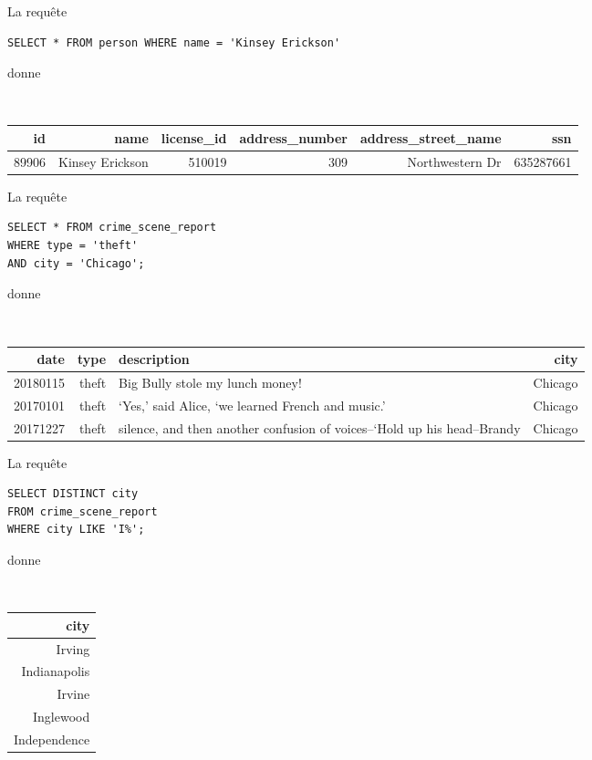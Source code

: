 \question{}
 
La requête
\begin{verbatim}
SELECT * FROM person WHERE name = 'Kinsey Erickson'
\end{verbatim}
donne
\begin{table}[!htp]
\centering
{\tt
\begin{tabular}{rrrrrr}
id&	name&	license\_id	&address\_number	&address\_street\_name	&ssn \\ \hline
89906&	Kinsey Erickson&	510019&	309&	Northwestern Dr	&635287661 \\
\end{tabular}
}
\end{table}

\question{}
 
La requête
\begin{verbatim}
SELECT * FROM crime_scene_report 
WHERE type = 'theft' 
AND city = 'Chicago';
\end{verbatim}
donne
\begin{table}[!htp]
\centering
{\tt
\begin{tabular}{rr>{\raggedleft\arraybackslash}p{10cm}r}
date&	type	&description	&city \\ \hline
20180115&	theft&	Big Bully stole my lunch money!&	Chicago \\
20170101&	theft&	‘Yes,’ said Alice, ‘we learned French and music.’ &	Chicago\\
20171227&	theft&	silence, and then another confusion of voices--‘Hold up his head--Brandy &	Chicago \\
\end{tabular}
}
\end{table}


\question{}
 
La requête
\begin{verbatim}
SELECT DISTINCT city 
FROM crime_scene_report 
WHERE city LIKE 'I%';
\end{verbatim}
donne
\begin{table}[!htp]
\centering
{\tt
\begin{tabular}{r}
city \\ \hline
Irving\\
Indianapolis\\
Irvine\\
Inglewood\\
Independence\\
\end{tabular}
}
\end{table}



